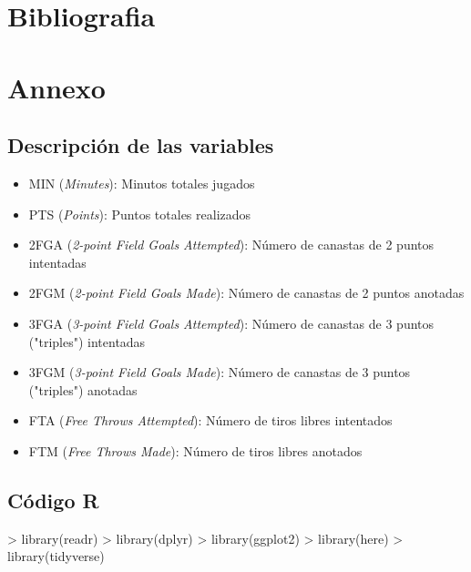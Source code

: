 \documentclass[paper=a4, fontsize=9pt]{article}
\begin{document}
\clearpage

\section{Bibliografia}

\clearpage

\section{Annexo}

\subsection{Descripción de las variables} \label{sec:Annexo1}

\begin{itemize}
  \item MIN (\emph{Minutes}): Minutos totales jugados
  \item PTS (\emph{Points}): Puntos totales realizados
  \item 2FGA (\emph{2-point Field Goals Attempted}): Número de canastas de 2 puntos intentadas
  \item 2FGM (\emph{2-point Field Goals Made}): Número de canastas de 2 puntos anotadas
  \item 3FGA (\emph{3-point Field Goals Attempted}): Número de canastas de 3 puntos ("triples") intentadas
  \item 3FGM (\emph{3-point Field Goals Made}): Número de canastas de 3 puntos ("triples") anotadas
  \item FTA (\emph{Free Throws Attempted}): Número de tiros libres intentados
  \item FTM (\emph{Free Throws Made}): Número de tiros libres anotados
\end{itemize}

\clearpage

\subsection{Código R}

\begin{Schunk}
\begin{Sinput}
> library(readr)
> library(dplyr)
> library(ggplot2)
> library(here)
> library(tidyverse)
\end{Sinput}
\end{Schunk}
\end{document}
